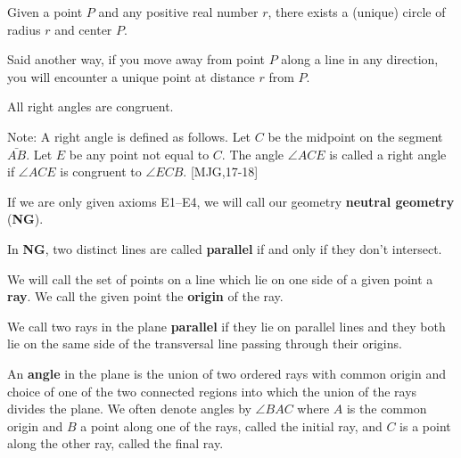 \documentclass{ximera}
\begin{document}
\begin{axiom}[E3]
Given a point $P$ and any positive real number $r$, there exists a
(unique) circle of radius $r$ and center $P$. 

Said another way, if you move away from point $P$ along a line in any
direction, you will encounter a unique point at distance $r$ from $P$.
\end{axiom}

\begin{axiom}[E4]
All right angles are congruent.

Note: A right angle is defined as follows. Let $C$ be the midpoint on
the segment $\bar{AB}$. Let $E$ be any point not equal to
$C$. The angle $\angle ACE$ is called a right angle if $\angle ACE$ is
congruent to $\angle ECB$. [MJG,17-18]
\end{axiom}

\begin{definition}
If we are only given axioms E1--E4, we will call our
geometry \textbf{neutral geometry} (\textbf{NG}).
\end{definition}

\begin{definition}
In \textbf{NG}, two distinct lines are called \textbf{parallel} if and
only if they don't intersect.
\end{definition}



\begin{definition} 
We will call the set of points on a line which lie on one side of a
given point a \textbf{ray}.  We call the given point the
\textbf{origin} of the ray.
\end{definition}

\begin{definition}
We call two rays in the plane \textbf{parallel} if they lie on
parallel lines and they both lie on the same side of the transversal
line passing through their origins.
\end{definition}

\begin{definition} An \textbf{angle} in the plane is the union of two ordered
rays with common origin and choice of one of the two connected regions
into which the union of the rays divides the plane. We often denote
angles by $\angle BAC$ where $A$ is the common origin and $B$ a point
along one of the rays, called the initial ray, and $C$ is a point
along the other ray, called the final ray.
\end{definition}
\end{document}

